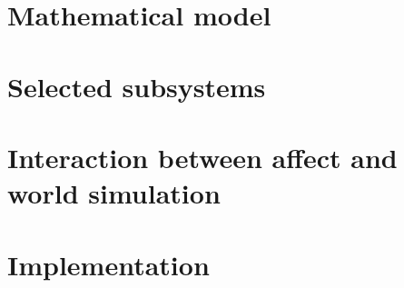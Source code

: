 \documentclass[]{scrartcl}
\begin{document}
\section{Mathematical model}\label{sec:mathematicalModel}



\section{Selected subsystems}\label{sec:selectedSubsystems}



\section{Interaction between affect and world simulation}



\section{Implementation}



\endgroup

\pagebreak

\nocite{*}



\end{document}
